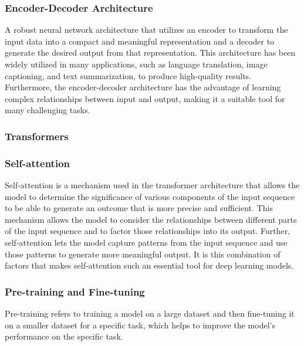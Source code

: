 \subsubsection{Encoder-Decoder Architecture}

A robust neural network architecture that utilizes an encoder\cite{cho-etal-2014-learning} to transform the input data into a compact and meaningful representation and a decoder to generate the desired output from that representation. This architecture has been widely utilized in many applications, such as language translation, image captioning, and text summarization, to produce high-quality results. Furthermore, the encoder-decoder architecture has the advantage of learning complex relationships between input and output, making it a suitable tool for many challenging tasks\cite{kumar2022deep}.

\subsubsection{Transformers}



\subsubsection{Self-attention}

Self-attention \cite{https://doi.org/10.48550/arxiv.1706.03762} is a mechanism used in the transformer architecture that allows the model to determine the significance of various components of the input sequence to be able to generate an outcome that is more precise and sufficient. This mechanism allows the model to consider the relationships between different parts of the input sequence and to factor those relationships into its output. Further, self-attention lets the model capture patterns from the input sequence and use those patterns to generate more meaningful output. It is this combination of factors that makes self-attention such an essential tool for deep learning models.

\subsubsection{Pre-training and Fine-tuning}

Pre-training refers to training a model on a large dataset and then fine-tuning it on a smaller dataset for a specific task, which helps to improve the model's performance on the specific task.

